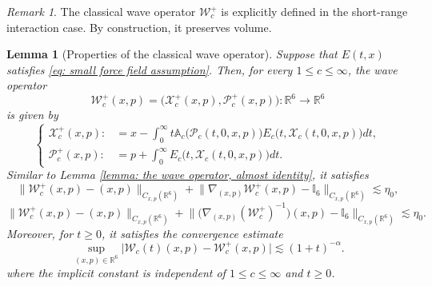 \documentclass[reqno, 11pt, letterpaper]{amsart}
\newtheorem{lemma}[theorem]{Lemma}
\theoremstyle{remark}
\newtheorem{remark}[theorem]{Remark}
\numberwithin{equation}{section}
\numberwithin{theorem}{section}
\numberwithin{table}{section}
\numberwithin{figure}{section}
\begin{document}
\begin{remark}
The classical wave operator $\mathcal{W}_c^+$ is explicitly defined in the short-range interaction case. By construction, it preserves volume.
\end{remark}

\begin{lemma}[Properties of the classical wave operator]\label{lemma: explicit formula for the classical wave operator}
Suppose that $E(t,x)$ satisfies \eqref{eq: small force field assumption}. Then, for every $1 \leq c \leq \infty$, the wave operator  
$$\mathcal{W}_c^+(x,p)=\Big(\mathcal{X}_c^+(x,p),\mathcal{P}_c^+(x,p)\Big):\mathbb{R}^6\to\mathbb{R}^6$$
is given by
\begin{equation}\label{eq: explicit representation of the wave operator-2}
\left\{\begin{aligned}
\mathcal{X}_c^+(x,p):&=x-\int_0^\infty t\mathbb{A}_c\big(\mathcal{P}_c(t,0,x,p)\big)E_c\big(t,\mathcal{X}_c(t,0,x,p)\big) dt,\\
\mathcal{P}_c^+(x,p):&=p+\int_0^\infty E_c\big(t,\mathcal{X}_c(t,0,x,p)\big)dt.
\end{aligned}\right.
\end{equation}
Similar to Lemma \ref{lemma:  the wave operator, almost identity}, it satisfies
\begin{equation}\label{eq: approx identity, wave operator}
\Big\|\mathcal{W}_c^+(x,p)-(x,p)\Big\|_{C_{x,p}(\mathbb{R}^6)}+\Big\|\nabla_{(x,p)}\mathcal{W}_c^+(x,p)-\mathbb{I}_6\Big\|_{C_{x,p}(\mathbb{R}^6)}\lesssim\eta_0,
\end{equation}
\begin{equation}\label{eq: approx identity, inverse wave operator}
\Big\|\mathcal{W}_c^+(x,p)-(x,p)\Big\|_{C_{x,p}(\mathbb{R}^6)}+\Big\|\Big(\nabla_{(x,p)}(\mathcal{W}_c^+)^{-1}\Big)(x,p)-\mathbb{I}_6\Big\|_{C_{x,p}(\mathbb{R}^6)}\lesssim\eta_0.
\end{equation}
Moreover, for $t\geq 0$, it satisfies the convergence estimate 
\begin{equation}\label{eq: rate of convergence to the wave operator}
\sup_{(x,p)\in\mathbb{R}^6}\big|\mathcal{W}_c(t)(x,p)-\mathcal{W}_c^+(x,p)\big|\lesssim (1+t)^{-\alpha}.
\end{equation}
where the implicit constant is independent of $1 \leq c \leq \infty$ and $t\geq 0$. 
\end{lemma}
\end{document}

